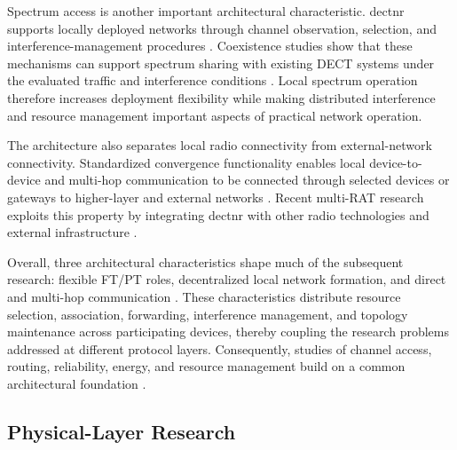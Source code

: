 Spectrum access is another important architectural characteristic.
\gls{dectnr} supports locally deployed networks through channel observation,
selection, and interference-management procedures
\cite{etsi_ts103636_2,etsi_ts103636_3,etsi_ts103636_4}.
Coexistence studies show that these mechanisms can support spectrum sharing
with existing DECT systems under the evaluated traffic and interference
conditions
\cite{samuylovPerformanceAssessmentDECT20202023}. Local spectrum operation
therefore increases deployment flexibility while making distributed
interference and resource management important aspects of practical network
operation.

The architecture also separates local radio connectivity from external-network
connectivity. Standardized convergence functionality enables local
device-to-device and multi-hop communication to be connected through selected
devices or gateways to higher-layer and external networks
\cite{etsi_ts103636_5}. Recent multi-RAT research exploits this property by
integrating \gls{dectnr} with other radio technologies and external
infrastructure
\cite{dangUniRATUnifiedDECT20202026}.

Overall, three architectural characteristics shape much of the subsequent
research: flexible FT/PT roles, decentralized local network formation, and
direct and multi-hop communication
\cite{kovalchukovDECT2020NewRadio2022,
perez-guiraoDECTNRUnveiling2022,
ahmadMACProtocolReducing2024,
fuhrlingRobustRoutingProtocol2025b}. These characteristics distribute
resource selection, association, forwarding, interference management, and
topology maintenance across participating devices, thereby coupling the
research problems addressed at different protocol layers. Consequently,
studies of channel access, routing, reliability, energy, and resource
management build on a common architectural foundation
\cite{samuylovPerformanceMACLayer2024a,
fuhrlingRobustRoutingProtocol2025b,
samuylovEmpoweringNearURLLCIoT2025,
bandaraExperimentalValidationAnalysis2025,
grafParetoOptimalityApproach2026a}.
\subsection{Physical-Layer Research}
\label{subsec:phy}


